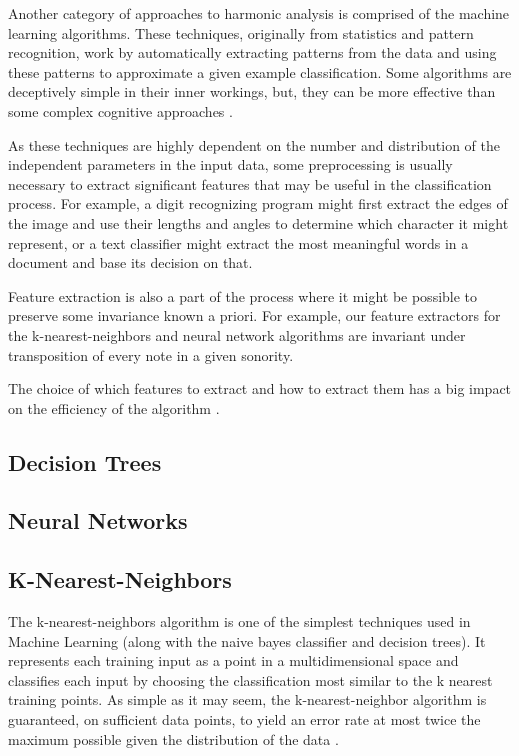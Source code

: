 \documentclass{article}
\begin{document}
Another category of approaches to harmonic analysis is comprised of
the machine learning algorithms.  These techniques, originally from
statistics and pattern recognition, work by automatically extracting
patterns from the data and using these patterns to approximate a given
example classification.  Some algorithms are deceptively simple in
their inner workings, but, they can be more effective than some
complex cognitive approaches \cite{gomez.ea:estimating}.

As these techniques are highly dependent on the number and
distribution of the independent parameters in the input data, some
preprocessing is usually necessary to extract significant features
that may be useful in the classification process. For example, a digit
recognizing program might first extract the edges of the image and use
their lengths and angles to determine which character it might
represent, or a text classifier might extract the most meaningful
words in a document and base its decision on that.

Feature extraction is also a part of the process where it might be
possible to preserve some invariance known a priori.  For example, our
feature extractors for the k-nearest-neighbors and neural network
algorithms are invariant under transposition of every note in a given
sonority.

The choice of which features to extract and how to extract them has a
big impact on the efficiency of the algorithm \cite{mitchell:machine}.

\subsection{Decision Trees}
\label{sec:tree}



\subsection{Neural Networks}
\label{sec:neural-net}



\subsection{K-Nearest-Neighbors}
\label{sec:knn}

The k-nearest-neighbors algorithm is one of the simplest techniques
used in Machine Learning (along with the naive bayes classifier and
decision trees).  It represents each training input as a point in a
multidimensional space and classifies each input by choosing the
classification most similar to the k nearest training points. As
simple as it may seem, the k-nearest-neighbor algorithm is guaranteed,
on sufficient data points, to yield an error rate at most twice the
maximum possible given the distribution of the data
\cite{fix.ea:important}.
\end{document}
